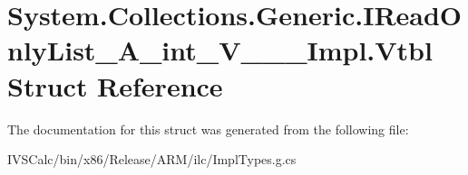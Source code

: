 \hypertarget{struct_system_1_1_collections_1_1_generic_1_1_i_read_only_list___a__int___v_______impl_1_1_vtbl}{}\section{System.\+Collections.\+Generic.\+I\+Read\+Only\+List\+\_\+\+A\+\_\+int\+\_\+\+V\+\_\+\+\_\+\+\_\+\+Impl.\+Vtbl Struct Reference}
\label{struct_system_1_1_collections_1_1_generic_1_1_i_read_only_list___a__int___v_______impl_1_1_vtbl}


The documentation for this struct was generated from the following file\+:\begin{DoxyCompactItemize}
\item 
I\+V\+S\+Calc/bin/x86/\+Release/\+A\+R\+M/ilc/Impl\+Types.\+g.\+cs\end{DoxyCompactItemize}
